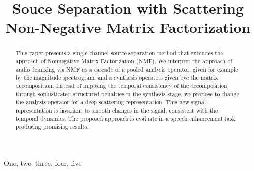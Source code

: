 \documentclass{article}
\title{Souce Separation with Scattering Non-Negative Matrix Factorization}
\begin{document}
%
\maketitle
%
\begin{abstract}
This paper presents a single channel source separation method
that extendes the approach of Nonnegative Matrix Factorization (NMF).
We interpret the approach of audio demixing via NMF as a cascade of a pooled analysis operator, given
for example by the magnitude spectrogram, and a synthesis operators given bye the matrix decomposition.
Instead of imposing the temporal consistency of the decomposition through
sophisticated structured penalties in the synthesis stage,
we propose to change the analysis operator for a deep scattering representation. This new signal representation is
invariant to smooth changes in the signal, consistent with the temporal dynamics.
The proposed approach is evaluate in a speech enhancement task producing promising results.
\end{abstract}
%
\begin{keywords}
One, two, three, four, five
\end{keywords}
%









\end{document}
